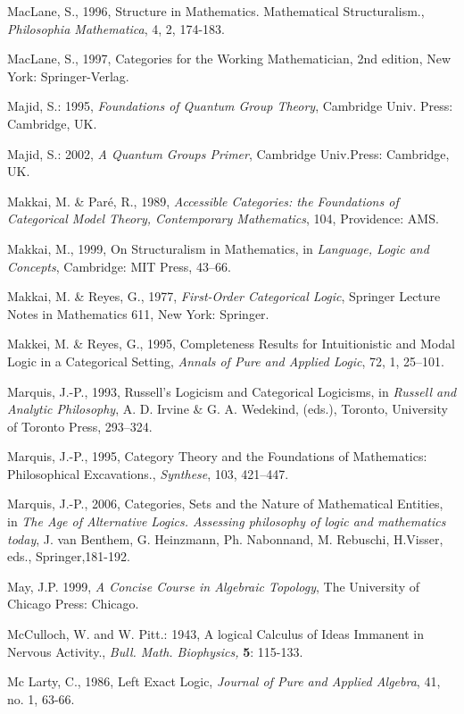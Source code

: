 \documentclass[12pt]{article}
\theoremstyle{plain}
\theoremstyle{definition}
\numberwithin{equation}{section}
\begin{document}
\begin{thebibliography}{199}
MacLane, S., 1996, Structure in Mathematics. Mathematical Structuralism., {\em Philosophia Mathematica}, 4, 2, 174-183. 

MacLane, S., 1997, Categories for the Working Mathematician, 2nd edition, New York: Springer-Verlag. 

Majid, S.: 1995, \emph{Foundations of Quantum Group Theory}, Cambridge Univ. Press: Cambridge, UK.

Majid, S.: 2002, \emph{A Quantum Groups Primer}, Cambridge Univ.Press: Cambridge, UK.

Makkai, M. \& Par\'e, R., 1989, {\em Accessible Categories: the Foundations of Categorical Model Theory, Contemporary Mathematics}, 104, Providence: AMS. 

Makkai, M., 1999, On Structuralism in Mathematics, in {\em Language, Logic and Concepts}, Cambridge: MIT Press, 43--66. 

Makkai, M. \& Reyes, G., 1977, {\em First-Order Categorical Logic}, Springer Lecture Notes in Mathematics 611, New York: Springer. 

Makkei, M. \& Reyes, G., 1995, Completeness Results for Intuitionistic and Modal Logic in a Categorical Setting, 
{\em Annals of Pure and Applied Logic}, 72, 1, 25--101. 

Marquis, J.-P., 1993, Russell's Logicism and Categorical Logicisms, in {\em Russell and Analytic Philosophy}, A. D. Irvine \& G. A. Wedekind, (eds.), Toronto, University of Toronto Press, 293--324.

Marquis, J.-P., 1995, Category Theory and the Foundations of Mathematics: Philosophical Excavations., 
{\em Synthese}, 103, 421--447. 

Marquis, J.-P., 2006, Categories, Sets and the Nature of Mathematical Entities, in {\em The Age of Alternative Logics. Assessing philosophy of logic and mathematics today}, J. van Benthem, G. Heinzmann, Ph. Nabonnand, M. Rebuschi, H.Visser, eds., Springer,181-192. 

May, J.P. 1999, \emph{A Concise Course in Algebraic Topology}, The University of Chicago Press: Chicago.

McCulloch, W. and W. Pitt.: 1943, A logical Calculus of Ideas Immanent in Nervous Activity., \emph{Bull. Math. Biophysics,} \textbf{5}: 115-133.

Mc Larty, C., 1986, Left Exact Logic, {\em Journal of Pure and Applied Algebra}, 41, no. 1, 63-66.


\end{thebibliography}
\end{document}
